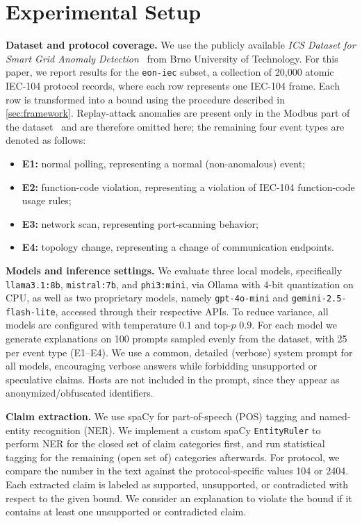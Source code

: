 \documentclass[conference]{IEEEtran}
\begin{document}
\section{Experimental Setup}\label{sec:setup}

\noindent\textbf{Dataset and protocol coverage.}
We use the publicly available \emph{ICS Dataset for Smart Grid Anomaly Detection}~\cite{MatousekRysavyGrofcik2022SmartGrid} from Brno University of Technology. For this paper, we report results for the \texttt{eon-iec} subset, a collection of 20,000 atomic IEC-104 protocol records, where each row represents one IEC-104 frame. Each row is transformed into a bound using the procedure described in \cref{sec:framework}. Replay-attack anomalies are present only in the Modbus part of the dataset~\cite{RysavyMatousek2021Modbus} and are therefore omitted here; the remaining four event types are denoted as follows:
\begin{itemize}
  \item \textbf{E1:} normal polling, representing a normal (non-anomalous) event;
  \item \textbf{E2:} function-code violation, representing a violation of IEC-104 function-code usage rules;
  \item \textbf{E3:} network scan, representing port-scanning behavior;
  \item \textbf{E4:} topology change, representing a change of communication endpoints.
\end{itemize}

\noindent\textbf{Models and inference settings.}
We evaluate three local models, specifically \texttt{llama3.1:8b}, \texttt{mistral:7b}, and \texttt{phi3:mini}, via Ollama with 4-bit quantization on CPU, as well as two proprietary models, namely \texttt{gpt-4o-mini} and \texttt{gemini-2.5-flash-lite}, accessed through their respective APIs. To reduce variance, all models are configured with temperature $0.1$ and top-$p$ $0.9$. For each model we generate explanations on 100 prompts sampled evenly from the dataset, with 25 per event type (E1--E4). We use a common, detailed (verbose) system prompt for all models, encouraging verbose answers while forbidding unsupported or speculative claims. Hosts are not included in the prompt, since they appear as anonymized/obfuscated identifiers.

\noindent\textbf{Claim extraction.}
We use spaCy for part-of-speech (POS) tagging and named-entity recognition (NER). We implement a custom spaCy \texttt{EntityRuler} to perform NER for the closed set of claim categories first, and run statistical tagging for the remaining (open set of) categories afterwards. For protocol, we compare the number in the text against the protocol-specific values 104 or 2404. Each extracted claim is labeled as supported, unsupported, or contradicted with respect to the given bound. We consider an explanation to violate the bound if it contains at least one unsupported or contradicted claim.
\end{document}

